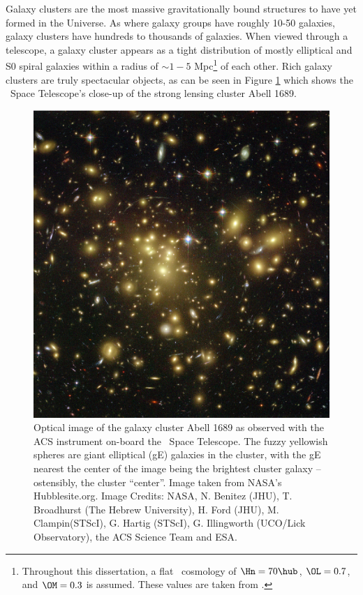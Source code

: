 Galaxy clusters are the most massive gravitationally bound structures
to have yet formed in the Universe. As where galaxy groups have
roughly 10-50 galaxies, galaxy clusters have hundreds to thousands of
galaxies. When viewed through a telescope, a galaxy cluster appears as
a tight distribution of mostly elliptical and S0 spiral galaxies
within a radius of $\sim1-5$ Mpc\footnote{Throughout this
dissertation, a flat \LCDM\ cosmology of $\Hn = 70 \hub$, $\OL =
0.7$, and $\OM = 0.3$ is assumed. These values are taken from
\citet{wmap}.} of each other. Rich galaxy clusters are truly
spectacular objects, as can be seen in Figure \ref{fig:a1689} which
shows the \hubble\ Space Telescope's close-up of the strong lensing
cluster Abell 1689.

\begin{figure}[htp]
  \begin{center}
    \includegraphics*[width=\textwidth, trim=0mm 0mm 0mm 0mm, clip]{a1689.eps}
    \caption[\hubble\ image of Abell 1689]{Optical image
      of the galaxy cluster Abell 1689 as observed with the ACS instrument
      on-board the \hubble\ Space Telescope. The fuzzy yellowish spheres
      are giant elliptical (gE) galaxies in the cluster, with the gE
      nearest the center of the image being the brightest cluster galaxy
      -- ostensibly, the cluster ``center''. Image taken from NASA's
      Hubblesite.org. Image Credits: NASA, N. Benitez (JHU), T. Broadhurst
      (The Hebrew University), H. Ford (JHU), M. Clampin(STScI), G. Hartig
      (STScI), G. Illingworth (UCO/Lick Observatory), the ACS Science Team
      and ESA.}
    \label{fig:a1689}
  \end{center}
\end{figure}

